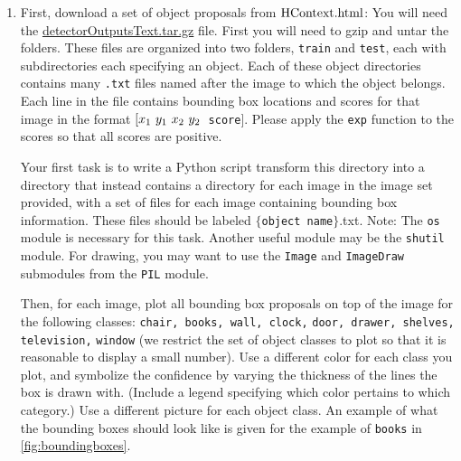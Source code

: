 \documentclass[12pt]{article}
\newcommand{\txt}[1]
{\textnormal{#1}}
\begin{document}
\begin{enumerate}

\item First, download a set of object proposals from \href{http://people.csail.mit.edu/myungjin/HContext.html}{$\txt{HContext.html}$}: You will need the \href{http://groups.csail.mit.edu/vision/Hcontext/data/detectorOutputsText.tar.gz}{detectorOutputsText.tar.gz} file. First you will need to gzip and untar the folders. These files are organized into two folders, \texttt{train} and \texttt{test}, each with subdirectories each specifying an object. Each of these object directories contains many \texttt{.txt} files named after the image to which the object belongs. Each line in the file contains bounding box locations and scores for that image in the format $[x_1 \txt{ } y_1 \txt{ } x_2 \txt{ } y_2 $\texttt{ score}$]$. Please apply the \texttt{exp} function to the scores so that all scores are positive. 

Your first task is to write a Python script transform this directory into a directory that instead contains a directory for each image in the image set provided, with a set of files for each image containing bounding box information. These files should be labeled $\{$\texttt{object name}$\}$.txt. Note: The \texttt{os} module is necessary for this task. Another useful module may be the \texttt{shutil} module. For drawing, you may want to use the \texttt{Image} and \texttt{ImageDraw} submodules from the \texttt{PIL} module.

Then, for each image, plot all bounding box proposals on top of the image for the following classes: \texttt{chair, books, wall, clock,} \texttt{door, drawer, shelves,} 
\texttt{television,} \texttt{window} (we restrict the set of object classes to plot so that it is reasonable to display a small number). Use a different color for each class you plot, and symbolize the confidence by varying the thickness of the lines the box is drawn with. (Include a legend specifying which color pertains to which category.) Use a different picture for each object class. An example of what the bounding boxes should look like is given for the example of \texttt{books} in \autoref{fig:boundingboxes}.


\end{enumerate}
\end{document}
